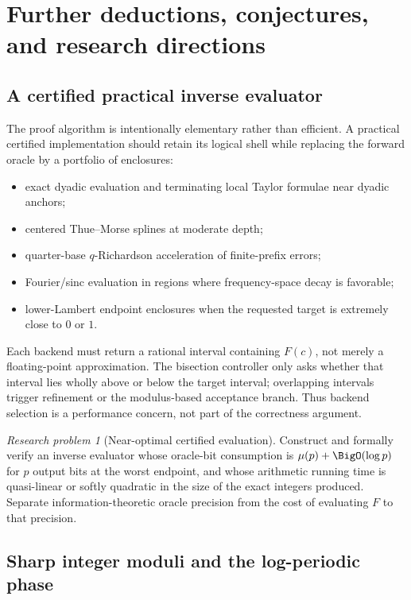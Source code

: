 \documentclass[11pt,oneside]{article}
\theoremstyle{definition}
\theoremstyle{remark}
\numberwithin{equation}{section}
\newtheorem{problem}[theorem]{Research problem}
\begin{document}
\section{Further deductions, conjectures, and research directions}
\label{sec:frontiers}

\subsection{A certified practical inverse evaluator}

The proof algorithm is intentionally elementary rather than efficient.  A
practical certified implementation should retain its logical shell while
replacing the forward oracle by a portfolio of enclosures:

\begin{itemize}
\item exact dyadic evaluation and terminating local Taylor formulae near
      dyadic anchors;
\item centered Thue--Morse splines at moderate depth;
\item quarter-base $q$-Richardson acceleration of finite-prefix errors;
\item Fourier/sinc evaluation in regions where frequency-space decay is
      favorable;
\item lower-Lambert endpoint enclosures when the requested target is extremely
      close to $0$ or $1$.
\end{itemize}

Each backend must return a rational interval containing $F(c)$, not merely a
floating-point approximation.  The bisection controller only asks whether
that interval lies wholly above or below the target interval; overlapping
intervals trigger refinement or the modulus-based acceptance branch.  Thus
backend selection is a performance concern, not part of the correctness
argument.

\begin{problem}[Near-optimal certified evaluation]
Construct and formally verify an inverse evaluator whose oracle-bit
consumption is $\mu(p)+\BigO(\log p)$ for $p$ output bits at the worst endpoint,
and whose arithmetic running time is quasi-linear or softly quadratic in the
size of the exact integers produced.  Separate information-theoretic oracle
precision from the cost of evaluating $F$ to that precision.
\end{problem}

\subsection{Sharp integer moduli and the log-periodic phase}
\end{document}
